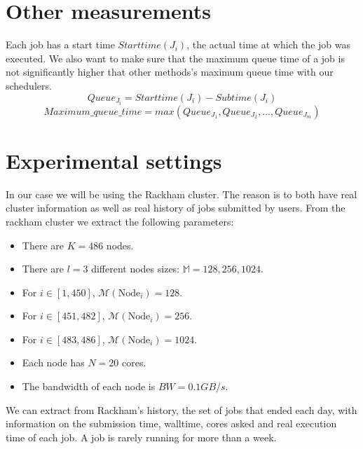 \documentclass[a4paper]{article}
\newcommand{\Node}[1]{\ensuremath{\mathrm{Node}_{#1}}\xspace}
\newcommand{\memory}{\ensuremath{\mathcal{M}}\xspace}
\newcommand{\bandwidth}{\mathit{BW}\xspace}
\newcommand{\submissiontime}{\mathit{Subtime}\xspace}
\newcommand{\start}{\mathit{Starttime}\xspace}
\begin{document}
\section{Other measurements}

Each job has a start time $\start(J_i)$, the actual time at which the job was executed.
We also want to make sure that the maximum queue time of a job is not significantly higher that other methods's maximum queue time with our schedulers.
$$
	Queue_{J_i} = \start(J_i) - \submissiontime(J_i)
$$
$$
	Maximum\_queue\_time = max(Queue_{J_1}, Queue_{J_2}, ..., Queue_{J_m})
$$

\section{Experimental settings}

In our case we will be using the Rackham cluster. The reason is to both have
real cluster information as well as real history of jobs submitted by users.
From the rackham cluster we extract the following parameters:
\begin{itemize}
	\item There are $K = 486$ nodes.
	\item There are $l = 3$ different nodes sizes: $\mathbb{M} = 128, 256, 1024$.
	\item For $i \in [1,450]$, $\memory(\Node{i}) = 128$.
	\item For $i \in [451,482]$, $\memory(\Node{i}) = 256$.
	\item For $i \in [483,486]$, $\memory(\Node{i}) = 1024$.
	\item Each node has $N = 20$ cores.
	\item The bandwidth of each node is $\bandwidth = 0.1 GB/s$.
\end{itemize}

We can extract from Rackham's history, the set of jobs that ended each day, with information on the submission time, walltime, cores asked
and real execution time of each job.
A job is rarely running for more than a week.
\end{document}
